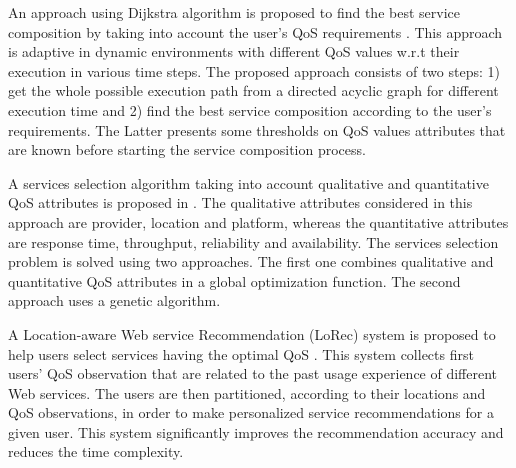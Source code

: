 \documentclass[10pt,journal,compsoc]{IEEEtran}
\begin{document}
%

An approach using Dijkstra algorithm is proposed to find the best service composition by taking into account the user's QoS requirements \cite{liu2009}. This approach is adaptive in dynamic environments with different QoS values w.r.t their execution in various time steps. The proposed approach consists of two steps: 1) get the whole possible execution path from a directed acyclic graph for different execution time and 2) find the best service composition according to the user's requirements. The Latter presents some thresholds on QoS values attributes that are known before starting the service composition process. 

A services selection algorithm taking into account qualitative and quantitative QoS attributes is proposed in \cite{Wang2017}. The qualitative attributes considered in this approach are provider, location and platform, whereas the quantitative attributes are response time, throughput, reliability and availability. The services selection problem is solved using two approaches. The first one combines qualitative and quantitative QoS attributes in a global optimization function. The second approach uses a genetic algorithm.

A Location-aware Web service Recommendation (LoRec) system is proposed to help users select services having the optimal QoS \cite{chen2014web}. This system collects first users' QoS observation that are related to the past usage experience of different Web services. The users are then partitioned, according to their locations and QoS observations, in order to make personalized service recommendations for a given user. This system significantly improves the recommendation accuracy and reduces the time complexity.
\end{document}
